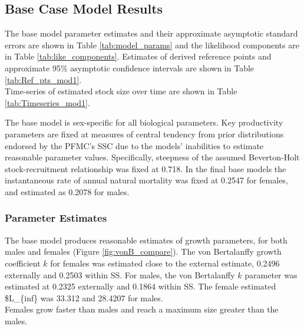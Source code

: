 \documentclass[12pt,]{article}
\begin{document}
\subsection{Base Case Model Results}\label{base-case-model-results}

The base model parameter estimates and their approximate asymptotic
standard errors are shown in Table \ref{tab:model_params} and the
likelihood components are in Table \ref{tab:like_components}. Estimates
of derived reference points and approximate 95\% asymptotic confidence
intervals are shown in Table \ref{tab:Ref_pts_mod1}.\\
Time-series of estimated stock size over time are shown in Table
\ref{tab:Timeseries_mod1}.

The base model is sex-specific for all biological parameters. Key
productivity parameters are fixed at measures of central tendency from
prior distributions endorsed by the PFMC's SSC due to the models'
inabilities to estimate reasonable parameter values. Specifically,
steepness of the assumed Beverton-Holt stock-recruitment relationship
was fixed at 0.718. In the final base models the instantaneous rate of
annual natural mortality was fixed at 0.2547 for females, and estimated
as 0.2078 for males.

\subsubsection{Parameter Estimates}\label{parameter-estimates}

The base model produces reasonable estimates of growth parameters, for
both males and females (Figure \ref{fig:vonB_compare}). The von
Bertalanffy growth coefficient \(k\) for females was estimated close to
the external estimate, 0.2496 externally and 0.2503 within SS. For
males, the von Bertalanffy \(k\) parameter was estimated at 0.2325
externally and 0.1864 within SS. The female estimated \$L\_\{inf\} was
33.312 and 28.4207 for males.\\
Females grow faster than males and reach a maximum size greater than the
males.
\end{document}
